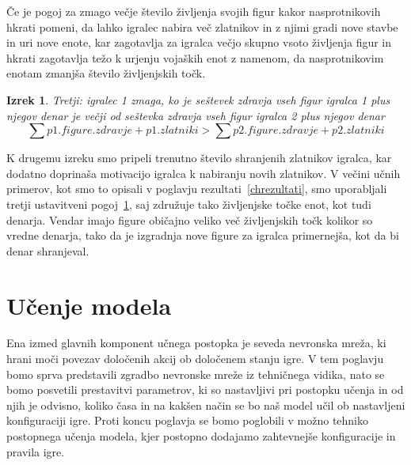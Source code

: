 \documentclass[a4paper, 12pt]{book}
\newtheorem{izrek}{Izrek}[chapter]
\begin{document}
Če je pogoj za zmago večje število življenja svojih figur kakor nasprotnikovih hkrati pomeni, da lahko igralec nabira več zlatnikov in z njimi gradi nove stavbe in uri nove enote, kar zagotavlja za igralca večjo skupno vsoto življenja figur in hkrati zagotavlja težo k urjenju vojaških enot z namenom, da nasprotnikovim enotam zmanjša število življenjskih točk.

\begin{izrek}
	\label{ustavitvenipogoj3}
Tretji: igralec 1 zmaga, ko je seštevek zdravja vseh figur igralca 1 plus njegov denar je večji od seštevka zdravja vseh figur igralca 2 plus njegov denar
	\begin{equation}
	\sum{p1.figure.zdravje} + p1.zlatniki > \sum{p2.figure.zdravje} + p2.zlatniki
	\label{eq:ustavitvenipogoj3}
	\end{equation}
\end{izrek}

K drugemu izreku smo pripeli trenutno število shranjenih zlatnikov igralca, kar dodatno doprinaša motivacijo igralca k nabiranju novih zlatnikov.
V večini učnih primerov, kot smo to opisali v poglavju rezultati~\ref{chrezultati}, smo uporabljali tretji ustavitveni pogoj~\ref{ustavitvenipogoj3}, saj združuje tako življenjske točke enot, kot tudi denarja.
Vendar imajo figure običajno veliko več življenjskih točk kolikor so vredne denarja, tako da je izgradnja nove figure za igralca primernejša, kot da bi denar shranjeval.


\chapter{Učenje modela}
\label{chucenjemodela}
Ena izmed glavnih komponent učnega postopka je seveda nevronska mreža, ki hrani moči povezav določenih akcij ob določenem stanju igre.
V tem poglavju bomo sprva predstavili zgradbo nevronske mreže iz tehničnega vidika, nato se bomo posvetili prestavitvi parametrov, ki so nastavljivi pri postopku učenja in od njih je odvisno, koliko časa in na kakšen način se bo naš model učil ob nastavljeni konfiguraciji igre.
Proti koncu poglavja se bomo poglobili v možno tehniko postopnega učenja modela, kjer postopno dodajamo zahtevnejše konfiguracije in pravila igre.
\end{document}
